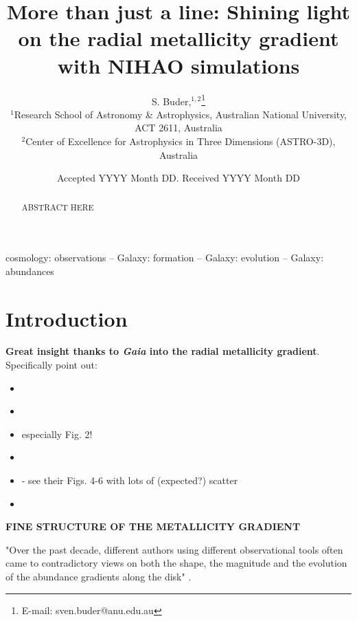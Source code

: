 \documentclass[fleqn,usenatbib]{mnras}
\title[NIHAO vs. Milky Way: Radial metallicity gradients]{More than just a line: Shining light on the radial metallicity gradient with NIHAO simulations}
\author[S. Buder]{
S. Buder,$^{1,2}$\thanks{E-mail: sven.buder@anu.edu.au}
\\
$^{1}$Research School of Astronomy \& Astrophysics, Australian National University, ACT 2611, Australia\\
$^{2}$Center of Excellence for Astrophysics in Three Dimensions (ASTRO-3D), Australia\\
}
\date{Accepted YYYY Month DD. Received YYYY Month DD}
\begin{document}
\label{firstpage}
\pagerange{\pageref{firstpage}--\pageref{lastpage}}
\maketitle

\begin{abstract} %
ABSTRACT HERE
\end{abstract}
\begin{keywords}
cosmology: observations -- Galaxy: formation -- Galaxy: evolution -- Galaxy: abundances
\end{keywords}



\section{Introduction}
\label{sec:intro}

\textbf{Great insight thanks to \textit{Gaia} into the radial metallicity gradient}. Specifically point out:
\begin{itemize}
    \item \citet{Eilers2019}
    \item \citet{Poggio2021}
    \item \citet{Poggio2022} especially Fig. 2!
    \item \citet{Imig2023}
    \item \citet{Chen2023} - see their Figs. 4-6 with lots of (expected?) scatter
    \item \citet{Hackshaw2024}
\end{itemize}

\textbf{FINE STRUCTURE OF THE METALLICITY GRADIENT} \citep{Genovali2014}

"Over the past decade, different authors using different observational tools often came to contradictory views on both the shape, the magnitude and the evolution of the abundance gradients along the disk" \citep{Chiappini2002}.
\end{document}
